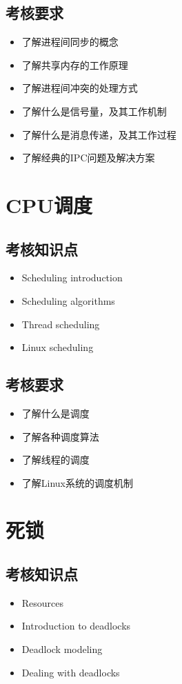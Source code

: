 \documentclass[11pt]{article}
\begin{document}
\subsection{考核要求}
\label{sec-3-2}
\begin{itemize}
\item 了解进程间同步的概念
\item 了解共享内存的工作原理
\item 了解进程间冲突的处理方式
\item 了解什么是信号量，及其工作机制
\item 了解什么是消息传递，及其工作过程
\item 了解经典的IPC问题及解决方案
\end{itemize}
\section{CPU调度}
\label{sec-4}
\subsection{考核知识点}
\label{sec-4-1}
\begin{itemize}
\item Scheduling introduction
\item Scheduling algorithms
\item Thread scheduling
\item Linux scheduling
\end{itemize}
\subsection{考核要求}
\label{sec-4-2}
\begin{itemize}
\item 了解什么是调度
\item 了解各种调度算法
\item 了解线程的调度
\item 了解Linux系统的调度机制
\end{itemize}
\section{死锁}
\label{sec-5}
\subsection{考核知识点}
\label{sec-5-1}
\begin{itemize}
\item Resources
\item Introduction to deadlocks
\item Deadlock modeling
\item Dealing with deadlocks
\end{itemize}
\end{document}
